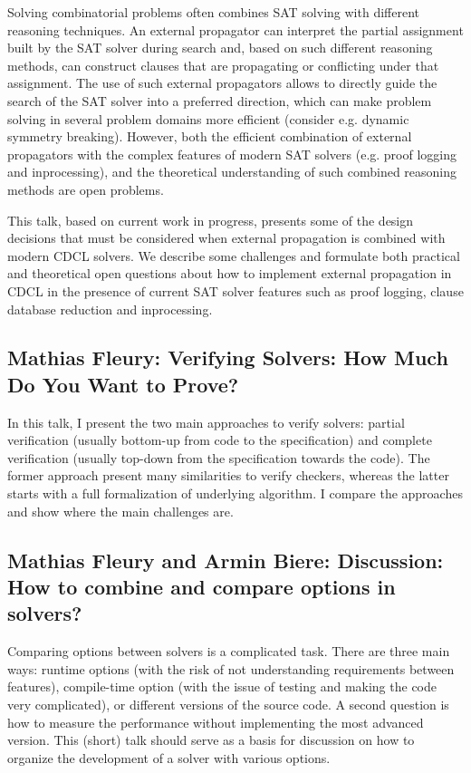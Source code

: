 \documentclass[11pt]{article}
\begin{document}
Solving combinatorial problems often combines SAT solving with different
reasoning techniques. An external propagator can interpret the partial assignment built by the SAT solver during search and, based on such different reasoning methods, can construct clauses that are propagating or conflicting under that assignment. The use of such external propagators allows to directly guide the search of the SAT solver into a preferred direction, which can make problem solving in several problem domains more efficient (consider e.g. dynamic symmetry breaking). However, both the efficient combination of external propagators with the complex features of modern SAT solvers (e.g. proof logging and inprocessing), and the theoretical understanding of such combined reasoning methods are open problems.

This talk, based on current work in progress, presents some of the design decisions that must be considered when external propagation is combined with modern CDCL solvers. We describe some challenges and formulate both practical and theoretical open questions about how to implement external propagation in CDCL in the presence of current SAT solver features such as proof logging, clause database reduction and inprocessing.


\subsection*{Mathias Fleury: Verifying Solvers: How Much Do You Want to Prove?}\label{FleuryInvited}

In this talk, I present the two main approaches to verify solvers: partial verification (usually bottom-up from code to the specification) and complete verification (usually top-down from the specification towards the code). The former approach present many similarities to verify checkers, whereas the latter starts with a full formalization of underlying algorithm. I compare the approaches and show where the main challenges are.


\subsection*{Mathias Fleury and Armin Biere: Discussion: How to combine and compare options in solvers?}\label{FleuryContributed}


Comparing options between solvers is a complicated
task. There are three main ways: runtime options (with the risk
of not understanding requirements between features), compile-time
option (with the issue of testing and making the code very
complicated), or different versions of the source code. A second
question is how to measure the performance without implementing
the most advanced version. This (short) talk should serve as a
basis for discussion on how to organize the development of a
solver with various options.
\end{document}
